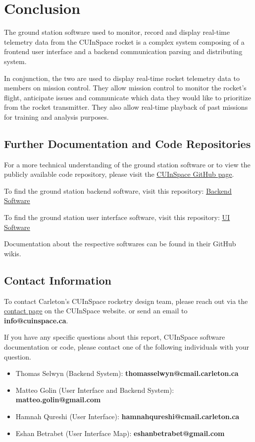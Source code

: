 \sectionfont{\fontsize{14}{14}\selectfont}
\section{Conclusion}

The ground station software used to monitor, record and display real-time telemetry data from the CUInSpace rocket is a
complex system composing of a frontend user interface and a backend communication parsing and distributing system.

In conjunction, the two are used to display real-time rocket telemetry data to members on mission control. They allow
mission control to monitor the rocket's flight, anticipate issues and communicate which data they would like to prioritize from 
the rocket transmitter. They also allow real-time playback of past missions for training and analysis purposes.

\subsection*{Further Documentation and Code Repositories}
For a more technical understanding of the ground station software or to view the publicly available code repository,
please visit the \href{https://github.com/CarletonURocketry}{\underline{CUInSpace GitHub page}}.

To find the ground station backend software, visit this repository:
\href{https://github.com/CarletonURocketry/ground-station}{\underline{Backend Software}}

To find the ground station user interface software, visit this repository:
\href{https://github.com/CarletonURocketry/ground-station-ui}{\underline{UI Software}} 

Documentation about the respective softwares can be found in their GitHub wikis.

\subsection*{Contact Information}

To contact Carleton's CUInSpace rocketry design team, please reach out via the \href{https://www.cuinspace.ca/contact-us}
{\underline{contact page}} on the CUInSpace website. or send an email to \textbf{info@cuinspace.ca}.

If you have any specific questions about this report, CUInSpace software documentation or code, please contact one of the 
following individuals with your question.

\begin{itemize}
    \item Thomas Selwyn (Backend System): \textbf{thomasselwyn@cmail.carleton.ca}
    \item Matteo Golin (User Interface and Backend System): \textbf{matteo.golin@gmail.com}
    \item Hamnah Qureshi (User Interface): \textbf{hamnahqureshi@cmail.carleton.ca}
    \item Eshan Betrabet (User Interface Map): \textbf{eshanbetrabet@gmail.com}
\end{itemize}
